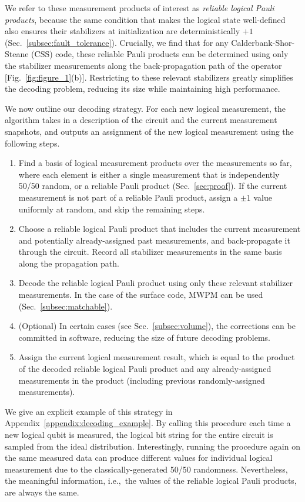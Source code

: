 \documentclass[prx,twocolumn,secnumarabic,balancelastpage,amsmath,amssymb,longbibliography]{revtex4-2}
\begin{document}
We refer to these measurement products of interest as \textit{reliable logical Pauli products}, because the same condition that makes the logical state well-defined also ensures their stabilizers at initialization are deterministically $+1$ (Sec.~\ref{subsec:fault_tolerance}).
%
Crucially, we find that for any Calderbank-Shor-Steane (CSS) code, these reliable Pauli products can be determined using only the stabilizer measurements along the back-propagation path of the operator [Fig.~\ref{fig:figure_1}(b)]. 
%
Restricting to these relevant stabilizers greatly simplifies the decoding problem, reducing its size while maintaining high performance.

We now outline our decoding strategy.
%
For each new logical measurement, the algorithm takes in a description of the circuit and the current measurement snapshots, and outputs an assignment of the new logical measurement using the following steps.
\begin{enumerate}
    \item Find a basis of logical measurement products over the  measurements so far, where each element is either a single measurement that is independently 50/50 random, or a reliable Pauli product (Sec.~\ref{sec:proof}).  
    If the current measurement is not part of a reliable Pauli product, assign a $\pm1$ value uniformly at random, and skip the remaining steps. 
    \item  Choose a reliable logical Pauli product that includes the current measurement and potentially already-assigned past measurements, and back-propagate it through the circuit.
    Record all stabilizer measurements in the same basis along the propagation path.
    \item Decode the reliable logical Pauli product using only these relevant stabilizer measurements.
    In the case of the surface code, MWPM can be used (Sec.~\ref{subsec:matchable}). 
    \item (Optional) In certain cases (see Sec.~\ref{subsec:volume}), the corrections can be committed in software, reducing the size of future decoding problems.
    \item Assign the current logical measurement result, which is equal to the product of the decoded reliable logical Pauli product and any already-assigned measurements in the product (including previous randomly-assigned measurements). 
\end{enumerate}
We give an explicit example of this strategy in Appendix~\ref{appendix:decoding_example}.
%
By calling this procedure each time a new logical qubit is measured, the logical bit string for the entire circuit is sampled from the ideal distribution.
%
Interestingly, running the procedure again on the same measured data can produce different values for individual logical measurement due to the classically-generated 50/50 randomness.
%
Nevertheless, the meaningful information, i.e.,~the values of the reliable logical Pauli products, are always the same.
\end{document}
